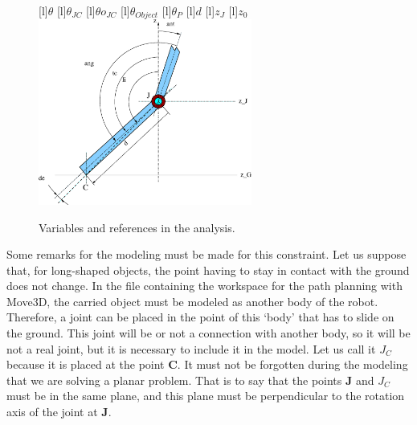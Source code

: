 \begin{figure}[ht!]
\begin{center}
[l]{$\theta$} 
[l]{$\theta_{JC}$}
[l]{$\theta o_{JC}$}
[l]{$\theta_{Object}$}
[l]{$\theta_P$}
[l]{$d$}
[l]{$z_J$} 
[l]{$z_0$}    
  \includegraphics[width=7cm]{FIG/Constraint/ground.eps}
\end{center}
\caption{\label{fig:ground} Variables and references in the analysis.}
\end{figure}

Some remarks for the modeling must be made for this constraint. Let us 
suppose that, for long-shaped objects, the point having to stay
in contact with the ground does not change. In the file containing the
workspace for the path planning with Move3D, the carried object must
be modeled as another body of the robot. Therefore, a joint can be
placed in the point of this `body' that has to slide on the ground.
This joint will be or not a connection with another body, so it will
be not a real joint, but it is necessary to include it in the model.
Let us call it {\bf $J_C$} because it is placed at the point {\bf C}.
It must not be forgotten during the modeling that we are solving a
planar problem. That is to say that the points {\bf J} and {\bf $J_C$}
must be in the same plane, and this plane must be perpendicular to the
rotation axis of the joint at {\bf J}.

